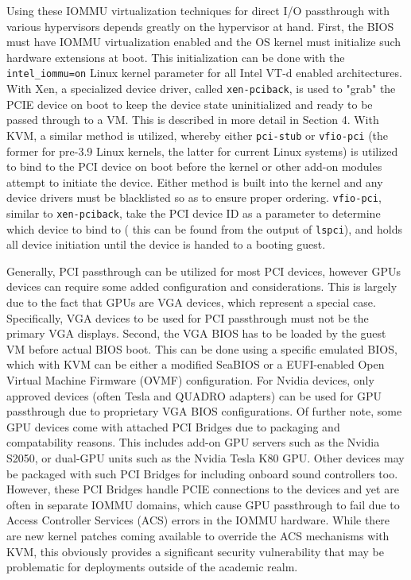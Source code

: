Using these IOMMU virtualization techniques for direct I/O passthrough with various hypervisors depends greatly on the hypervisor at hand.  First, the BIOS must have IOMMU virtualization enabled and the OS kernel must initialize such hardware extensions at boot. This initialization can be done with the \verb|intel_iommu=on| Linux kernel parameter for all Intel VT-d enabled architectures.  With Xen, a specialized device driver, called \verb|xen-pciback|, is used to "grab" the PCIE device on boot to keep the device state uninitialized and ready to be passed through to a VM. This is described in more detail in Section 4. With KVM, a similar method is utilized, whereby either \verb|pci-stub| or \verb|vfio-pci| (the former for pre-3.9 Linux kernels, the latter for current Linux systems) is utilized to bind to the PCI device on boot before the kernel or other add-on modules attempt to initiate the device.  Either method is built into the kernel and any device drivers must be blacklisted so as to ensure proper ordering. \verb|vfio-pci|, similar to \verb|xen-pciback|, take the PCI device ID as a parameter to determine which device to bind to ( this can be found from the output of \verb|lspci|), and holds all device initiation until the device is handed to a booting guest.  

Generally, PCI passthrough can be utilized for most PCI devices, however GPUs devices can require some added configuration and considerations.  This is largely due to the fact that GPUs are VGA devices, which represent a special case. Specifically, VGA devices to be used for PCI passthrough must not be the primary VGA displays. Second, the VGA BIOS has to be loaded by the guest VM before actual BIOS boot.  This can be done using a specific emulated BIOS, which with KVM can be either a modified SeaBIOS or a EUFI-enabled Open Virtual Machine Firmware (OVMF) configuration.  For Nvidia devices, only approved devices (often Tesla and QUADRO adapters) can be used for GPU passthrough due to proprietary VGA BIOS configurations. Of further note, some GPU devices come with attached PCI Bridges due to packaging and compatability reasons. This includes add-on GPU servers such as the Nvidia S2050, or dual-GPU units such as the Nvidia Tesla K80 GPU. Other devices may be packaged with such PCI Bridges for including onboard sound controllers too. However, these PCI Bridges handle PCIE connections to the devices and yet are often in separate IOMMU domains, which cause GPU passthrough to fail due to Access Controller Services (ACS) errors in the IOMMU hardware. While there are new kernel patches coming available to override the ACS mechanisms with KVM, this obviously provides a significant security vulnerability that may be problematic for deployments outside of the academic realm. 


